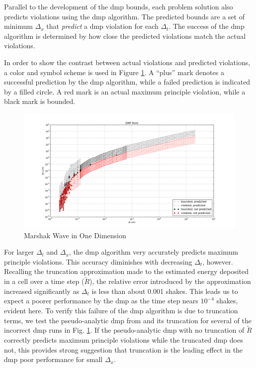 Parallel to the development of the \gls{dmp} bounds, each problem solution also predicts violations using the \gls{dmp} algorithm.  The predicted bounds are a set of minimum $\Delta_x$ that \emph{predict} a \gls{dmp} violation for each $\Delta_t$. The success of the \gls{dmp} algorithm is determined by how close the predicted violations match the actual violations.

In order to show the contrast between actual violations and predicted violations, a color and symbol scheme is used in Figure \ref{fig:results_multigroup}.  A ``plus'' mark denotes a successful prediction by the \gls{dmp} algorithm, while a failed prediction is indicated by a filled circle.  A red mark is an actual maximum principle violation, while a black mark is bounded.

\begin{figure}[htb]
\centering
\includegraphics[width=\linewidth]{./graphics/mg_full}
\caption{Marshak Wave in One Dimension}
\label{fig:results_multigroup}
\end{figure}

For larger $\Delta_t$ and $\Delta_x$, the \gls{dmp} algorithm very accurately predicts maximum principle violations.  This accuracy diminishes with decreasing $\Delta_t$, however.  Recalling the truncation approximation made to the estimated energy deposited in a cell over a time step ($\tilde R$), the relative error introduced by the approximation increased significantly as $\Delta_t$ is less than about 0.001 shakes.  This leads us to expect a poorer performance by the \gls{dmp} as the time step nears $10^{-4}$ shakes, evident here.  To verify this failure of the \gls{dmp} algorithm is due to truncation terms, we test the pseudo-analytic \gls{dmp} from \cite{WolLarDen} and its truncation for several of the incorrect \gls{dmp} runs in Fig. \ref{fig:results_multigroup}.  If the pseudo-analytic \gls{dmp} with no truncation of $\tilde R$ correctly predicts maximum principle violations while the truncated \gls{dmp} does not, this provides strong suggestion that truncation is the leading effect in the \gls{dmp} poor performance for small $\Delta_x$.

